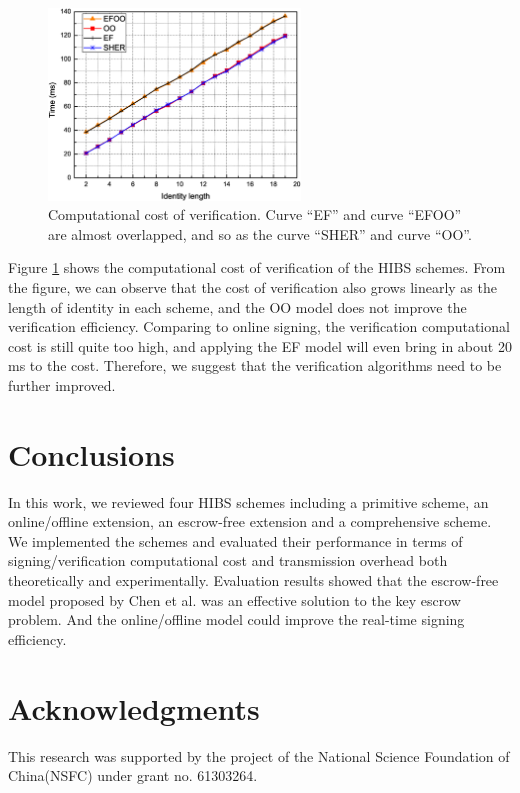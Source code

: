 \documentclass[letter]{ieice}
\begin{document}
\begin{figure}[htbp]
\centering
\includegraphics[width=6.7cm]{verify.eps}
\caption{Computational cost of verification. Curve ``EF'' and curve ``EFOO'' are almost overlapped, and so as the curve ``SHER'' and curve ``OO''.} \label{fig-verify}
\end{figure}

Figure \ref{fig-verify} shows the computational cost of verification of the HIBS schemes.
From the figure, we can observe that the cost of verification also grows linearly as the length of identity in each scheme, and the OO model does not improve the verification efficiency.
Comparing to online signing, the verification computational cost is still quite too high, and applying the EF model will even bring in about 20 ms to the cost. 
Therefore, we suggest that the verification algorithms need to be further improved.

\section{Conclusions}
In this work, we reviewed four HIBS schemes including a primitive scheme, an online/offline extension, an escrow-free extension and a comprehensive scheme.
We implemented the schemes and evaluated their performance in terms of signing/verification computational cost and transmission overhead  both theoretically and experimentally.
Evaluation results showed that the escrow-free model proposed by Chen et al. was an effective solution to the key escrow problem. 
And the online/offline model could improve the real-time signing efficiency. 

\section*{Acknowledgments}
This research was supported by the project of the National Science Foundation of China(NSFC) under grant no. 61303264.

\end{document}
